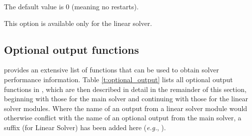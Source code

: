 {
  The default value is $0$ (meaning no restarts).

  {\warn}This option is available only for the {\kinspgmr} linear solver.
}

\subsection{Optional output functions}\label{ss:optional_output}

{\kinsol} provides an extensive list of functions that can be used to obtain
solver performance information.
Table \ref{t:optional_output} lists all optional output functions in {\kinsol},
which are then described in detail in the remainder of this section, beginning with those
for the main {\kinsol} solver and continuing with those for the linear solver
modules. Where the name of an output from a linear solver module would otherwise conflict
with the name of an optional output from the main solver, a suffix  (for Linear Solver)
has been added here ({\em e.g.}, ).

\newlength{\colABC}
\settowidth{\colABC}{No. of r.h.s. calls for finite diff. Jacobian-vector evals.}
\newlength{\colDEF}

\label{t:optional_output}
\tablelasttail{\hline}

